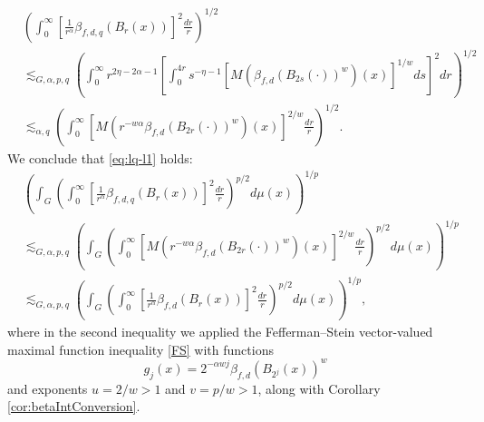 \documentclass[11pt,reqno]{amsart}
\newcommand{\1}{\mathbf 1}
\begin{document}
\begin{itemize}
\begin{align*}
&\left( \int_0^{\infty} \left[\frac{1}{r^\alpha}\beta_{f,d,q}\left(B_r\left(x\right)\right)\right]^2 \frac{dr}{r} \right)^{1/2} \\
& \lesssim_{G,\alpha,p,q} \left(\int_0^{\infty} r^{2\eta - 2\alpha-1} \left[ \int_{0}^{4r} s^{-\eta-1} \left[M\left(\beta_{f,d}\left(B_{2s}\left(\cdot\right)\right)^w\right)\left(x\right)\right]^{1/w}  ds \right]^2  dr \right)^{1/2} \\
& \lesssim_{\alpha,q} \left(\int_0^\infty \left[M\left(r^{-w\alpha}\beta_{f,d}\left(B_{2r}\left(\cdot\right)\right)^w\right)\left(x\right)\right]^{2/w} \frac{dr}{r} \right)^{1/2}.
\end{align*}
We conclude that \eqref{eq:lq-l1} holds:
\begin{align*}
&\left( \int_G \left( \int_0^\infty \left[\frac 1{r^\alpha} \beta_{f,d,q}\left(B_r\left(x\right)\right)\right]^2  \frac{dr}{r} \right)^{p/2}  d\mu\left(x\right) \right)^{1/p} \\
&\lesssim_{G,\alpha,p,q} \left(\int_G\left(\int_0^\infty \left[M\left(r^{-w\alpha}\beta_{f,d}\left(B_{2r}\left(\cdot\right)\right)^w\right)\left(x\right)\right]^{2/w} \frac{dr}{r} \right)^{p/2}d\mu\left(x\right)\right)^{1/p}\\
&\lesssim_{G,\alpha,p,q} \left(\int_G \left( \int_0^\infty \left[\frac{1}{r^\alpha} \beta_{f,d}\left(B_r\left(x\right)\right) \right]^{2}  \frac{dr}{r} \right)^{p/2}  d\mu\left(x\right) \right)^{1/p},
\end{align*}
where in the second inequality we applied the Fefferman--Stein vector-valued maximal function inequality \eqref{FS} with functions
\[
g_{j}\left(x\right) = 2^{-\alpha w j}\beta_{f,d}\left(B_{2^j}\left(x\right)\right)^w
\]
and exponents $u = 2/w > 1$ and $v = p/w > 1$, along with Corollary \ref{cor:betaIntConversion}.



\end{itemize}
\end{document}
